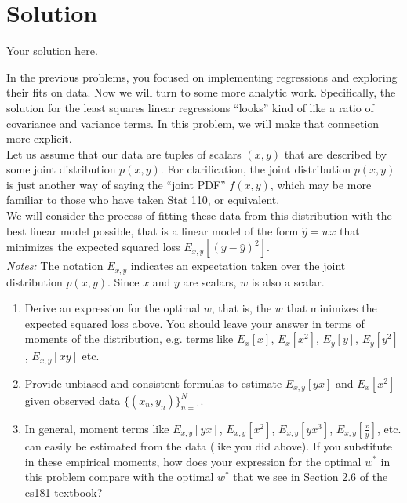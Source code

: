 \documentclass[submit]{harvardml}
\newenvironment{solution}
  {\color{blue}\section*{Solution}}
{}
\begin{document}
\begin{solution}
	Your solution here.
\end{solution}

\newpage
\begin{problem}

  In the previous problems, you focused on implementing regressions
  and exploring their fits on data. Now we will turn to some more
  analytic work.  Specifically, the solution for the least squares
  linear regressions ``looks'' kind of like a ratio of covariance and
  variance terms.  In this problem, we will make that connection more
  explicit. \\

  \noindent Let us assume that our data are tuples of scalars $(x,y)$ that are
  described by some joint distribution $p(x,y)$.  For clarification, the joint distribution $p(x,y)$ is just another way of saying the ``joint PDF'' $f(x,y)$, which may be more familiar to those who have taken Stat 110, or equivalent. \\
  
  \noindent We will consider the process of fitting these data from this distribution with the best linear model
  possible, that is a linear model of the form $\hat{y} = wx$ that
  minimizes the expected squared loss $E_{x,y}[ ( y - \hat{y} )^2
  ]$.\\

\noindent \emph{Notes:} The notation $E_{x, y}$ indicates an
expectation taken over the joint distribution $p(x,y)$.  Since $x$ and
$y$ are scalars, $w$ is also a scalar.
  
  \begin{enumerate}

  \item Derive an expression for the optimal $w$, that is, the $w$
    that minimizes the expected squared loss above.  You should leave
    your answer in terms of moments of the distribution, e.g. terms
    like $E_x[x]$, $E_x[x^2]$, $E_y[y]$, $E_y[y^2]$, $E_{x,y}[xy]$
    etc.

\item Provide unbiased and consistent formulas to estimate $E_{x, y}[yx]$
 and $E_x[x^2]$ given observed data $\{(x_n,y_n)\}_{n=1}^N$.

\item In general, moment terms like $E_{x, y}[yx]$, $E_{x, y}[x^2]$,
  $E_{x, y}[yx^3]$, $E_{x, y}[\frac{x}{y}]$, etc. can easily be
  estimated from the data (like you did above).  If you substitute in
  these empirical moments, how does your expression for the optimal
  $w^*$ in this problem compare with the optimal $w^*$ that we see in
  Section 2.6 of the cs181-textbook?


\end{enumerate}
\end{problem}
\end{document}
